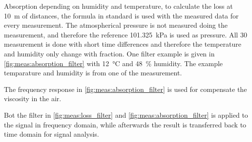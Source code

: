  



Absorption depending on humidity and temperature, to calculate the loss at \SI{10}{\meter} of distances, the formula in standard \citep{} is used with the measured data for every measurement. The atmospherical pressure is not measured doing the measurement, and therefore the reference \SI{101.325}{\kilo\pascal} is used as pressure. All 30 measurement is done with short time differences and therefore the temperature and humidity only change with fraction. One filter example is given in \autoref{fig:meas:absorption_filter} with \SI{12}{\celsius} and \SI{48}{\percent} humidity. The example temparature and humidity is from one of the measurement.

  
 
The frequency response in \autoref{fig:meas:absorption_filter} is used for compensate the viscosity in the air. 

Bot the filter in \autoref{fig:meas:loss_filter} and \autoref{fig:meas:absorption_filter} is applied to the signal in frequency domain, while afterwards the result is transferred back to time domain for signal analysis. 
  

